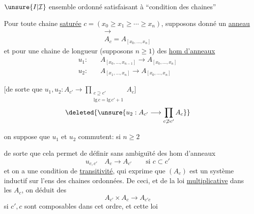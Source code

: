 $\unsure{I|\mathcal I}$ ensemble ordonné satisfaisant à ``condition des chaines''

Pour toute chaine \uline{saturée} $c=(x_0\geq x_1\geq\cdots\geq x_n)$, supposons donné un \uline{anneau}
\[\begin{aligned}\longrightarrow\\A_c=A_{[x_0,\ldots,x_n]}\end{aligned}\]
et pour une chaine de longueur  (supposons $n\geq1$) des \uline{hom d'anneaux}
\[
\begin{aligned}
u_1:\quad&A_{[x_0,\ldots,x_{n-1}]}\longrightarrow A_{[x_0,\ldots,x_n]}\\
u_2:\quad&A_{[x_1,\ldots,x_n]}\longrightarrow A_{[x_0,\ldots,x_n]}
\end{aligned}
\]

[de sorte que $u_1,u_2:A_{c'}\longrightarrow\displaystyle\prod_{\substack{c\supseteq c'\\\mathrm{lg}\,c=\mathrm{lg}\,c'+1}}A_c$]
\[\deleted{\unsure{u_2:A_{c'}\longrightarrow\prod_{c\not\supset c'} A_c}}\]

on suppose que $u_1$ et $u_2$ commutent: si $n\geq2$

de sorte que cela permet de définir sans ambiguïté des hom d'anneaux
\[u_{c,c'}\quad A_c\longrightarrow A_{c'}\qquad\text{si }c\subset c'\]
\deleted{[\unsure{donc}} et on a une condition de \uline{transitivité}, qui exprime que $(A_c)$ est un système inductif sur l'ens des chaines ordonnées. De ceci, et de la loi \uline{multiplicative} dans les $A_c$, on déduit des  
\[A_{c'}\times A_c\longrightarrow A_{c'c}\]
si $c',c$ sont composables dans cet ordre, et cette loi
